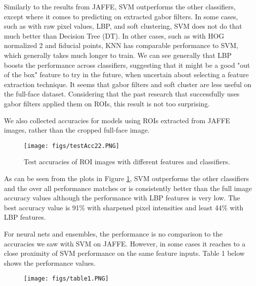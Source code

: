 \documentclass[10pt,twocolumn,letterpaper]{article}
\begin{document}
Similarly to the results from JAFFE, SVM outperforms the other classifiers, except where it comes to predicting on extracted gabor filters. In some cases, such as with raw pixel values, LBP, and soft clustering, SVM does not do that much better than Decision Tree (DT). In other cases, such as with HOG normalized 2 and fiducial points, KNN has comparable performance to SVM, which generally takes much longer to train. We can see generally that LBP boosts the performance across classifiers, suggesting that it might be a good "out of the box" feature to try in the future, when uncertain about selecting a feature extraction technique. It seems that gabor filters and soft cluster are less useful on the full-face dataset. Considering that the past research that successfully uses gabor filters applied them on ROIs, this result is not too surprising.

We also collected accuracies for models using ROIs extracted from JAFFE images, rather than the cropped full-face image. 
\begin{figure}[h]
\texttt{[image: figs/testAcc22.PNG]}
\caption{Test accuracies of ROI images with different features and classifiers.}
\label{fig:testacc2}
\end{figure}

As can be seen from the plots in Figure \ref{fig:testacc2}, SVM outperforms the other classifiers and the over all performance matches or is consistently better than the full image accuracy values although the performance with LBP features is very low. The best accuracy value is 91\% with sharpened pixel intensities and least 44\% with LBP features. 

For neural nets and ensembles, the performance is no comparison to the accuracies we saw with SVM on JAFFE. However, in some cases it reaches to a close proximity of SVM performance on the same feature inputs. Table 1 below shows the performance values.

\begin{figure}[h]
\texttt{[image: figs/table1.PNG]}
\label{fig:testacc4}
\end{figure}
%
\end{document}
